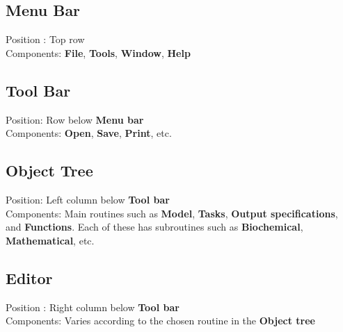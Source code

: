 \documentclass[10pt]{article}
\theoremstyle{definition}
\theoremstyle{remark}
\begin{document}
	\subsection{Menu Bar}
	Position : Top row\\
	Components: \textbf{File}, \textbf{Tools}, \textbf{Window}, \textbf{Help}
	
	\subsection{Tool Bar}
	Position: Row below \textbf{Menu bar}\\
	Components: \textbf{Open}, \textbf{Save}, \textbf{Print}, etc.
	
	\subsection{Object Tree}
	Position: Left column below \textbf{Tool bar}\\
	Components: Main routines such as \textbf{Model}, \textbf{Tasks}, \textbf{Output specifications}, and \textbf{Functions}. Each of these has subroutines such as \textbf{Biochemical}, \textbf{Mathematical}, etc.
	
	\subsection{Editor}
	Position : Right column below \textbf{Tool bar}\\
	Components: Varies according to the chosen routine in the \textbf{Object tree}
	
\end{document}
